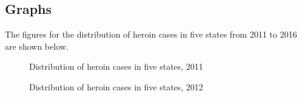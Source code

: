 \documentclass{mcmthesis}
\numberwithin{equation}{section}
\numberwithin{figure}{section}
\numberwithin{table}{section}
\renewcommand{\thefigure}{{\bf {\arabic{section}-\arabic{figure}}}}
\theoremstyle{mydef}
\begin{document}
\newpage
\renewcommand{\thefigure}{{\bf{\Alph{section}-\arabic{figure}}}}
\begin{appendices}

\section{ Graphs}

The figures for the distribution of heroin cases in five states from 2011 to 2016 are shown below.

\begin{figure}[H]
  \caption{Distribution of heroin cases in five states, 2011}\label{fighe11}
\end{figure}
\begin{figure}[H]
  \caption{Distribution of heroin cases in five states, 2012}\label{fighe12}
\end{figure}

\end{appendices}
\end{document}
